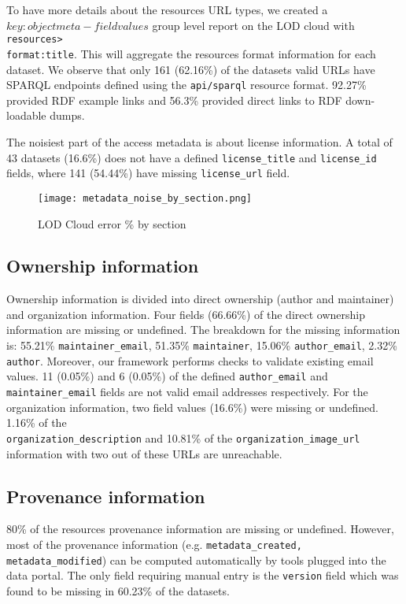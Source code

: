 To have more details about the resources URL types, we created a $key:object meta-field values$ group level report on the LOD cloud with \texttt{resources>\\format:title}. This will aggregate the resources format information for each dataset. We observe that only 161 (62.16\%) of the datasets valid URLs have SPARQL endpoints defined using the \texttt{api/sparql} resource format. 92.27\% provided RDF example links and 56.3\% provided direct links to RDF down-loadable dumps.

The noisiest part of the access metadata is about license information. A total of 43 datasets (16.6\%) does not have a defined \texttt{license\_title} and \texttt{license\_id} fields, where 141 (54.44\%) have missing \texttt{license\_url} field.

\begin{figure}[!ht]
  \centering
  \texttt{[image: metadata\_noise\_by\_section.png]}
  \caption{LOD Cloud error \% by section}
  \label{fig:metadata_noise_by_section}
\end{figure}

\subsection{Ownership information}
Ownership information is divided into direct ownership (author and maintainer) and organization information. Four fields (66.66\%) of the direct ownership information are missing or undefined. The breakdown for the missing information is: 55.21\% \texttt{maintainer\_email}, 51.35\% \texttt{maintainer}, 15.06\% \texttt{author\_email}, 2.32\% \texttt{author}. Moreover, our framework performs checks to validate existing email values. 11 (0.05\%) and 6 (0.05\%) of the defined \texttt{author\_email} and \texttt{maintainer\_email} fields are not valid email addresses respectively. For the organization information, two field values (16.6\%) were missing or undefined. 1.16\% of the \\\texttt{organization\_description} and 10.81\% of the \texttt{organization\-\_image\_url} information with two out of these URLs are unreachable.

\subsection{Provenance information}
80\% of the resources provenance information are missing or undefined. However, most of the provenance information (e.g. \texttt{metadata\_created, metadata\_modified}) can be computed automatically by tools plugged into the data portal. The only field requiring manual entry is the \texttt{version} field which was found to be missing in 60.23\% of the datasets.

